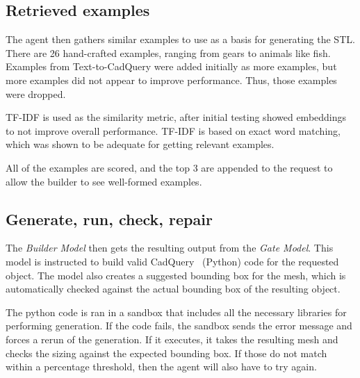 \subsection{Retrieved examples}

The agent then gathers similar examples to use as a basis for generating the STL.
There are 26 hand-crafted examples, ranging from gears to animals like fish.
Examples from Text-to-CadQuery were added initially as more examples, but more examples did not appear to improve performance.
Thus, those examples were dropped.

TF-IDF is used as the similarity metric, after initial testing showed embeddings to not improve overall performance.
TF-IDF is based on exact word matching, which was shown to be adequate for getting relevant examples.

All of the examples are scored, and the top 3 are appended to the request to allow the builder to see well-formed examples.

\subsection{Generate, run, check, repair}

The \textit{Builder Model} then gets the resulting output from the \textit{Gate Model}.
This model is instructed to build valid CadQuery~\cite{cadquery} (Python) code for the requested object.
The model also creates a suggested bounding box for the mesh, which is automatically checked against the actual bounding box of the resulting object.

The python code is ran in a sandbox that includes all the necessary libraries for performing generation.
If the code fails, the sandbox sends the error message and forces a rerun of the generation.
If it executes, it takes the resulting mesh and checks the sizing against the expected bounding box.
If those do not match within a percentage threshold, then the agent will also have to try again.

